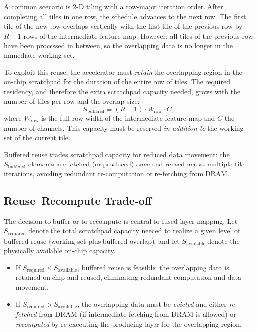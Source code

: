A common scenario is 2-D tiling with a row-major iteration order.
After completing all tiles in one row, the schedule advances to the
next row.
The first tile of the new row overlaps vertically with the first tile
of the previous row by $R - 1$ rows of the intermediate feature map.
However, all tiles of the previous row have been processed in between,
so the overlapping data is no longer in the immediate working set.

To exploit this reuse, the accelerator must \emph{retain} the
overlapping region in the on-chip scratchpad for the duration of
the entire row of tiles.
The required residency, and therefore the extra scratchpad capacity
needed, grows with the number of tiles per row and the overlap
size:
%
\begin{equation}
\label{eq:buffered-reuse-size}
S_{\text{buffered}} = (R - 1) \cdot W_{\text{row}} \cdot C,
\end{equation}
%
where $W_{\text{row}}$ is the full row width of the intermediate
feature map and $C$ the number of channels.
This capacity must be reserved \emph{in addition to} the working
set of the current tile.

Buffered reuse trades scratchpad capacity for reduced data movement:
the $S_{\text{buffered}}$ elements are fetched (or produced) once
and reused across multiple tile iterations, avoiding redundant
re-computation or re-fetching from DRAM.


\subsection{Reuse--Recompute Trade-off}
\label{sec:fds-reuse-recompute}

The decision to buffer or to recompute is central to fused-layer
mapping.
Let $S_{\text{required}}$ denote the total scratchpad capacity
needed to realize a given level of buffered reuse (working set plus
buffered overlap), and let $S_{\text{available}}$ denote the
physically available on-chip capacity.

\begin{itemize}
  \item If $S_{\text{required}} \le S_{\text{available}}$, buffered
        reuse is feasible: the overlapping data is retained on-chip
        and reused, eliminating redundant computation and data
        movement.
  \item If $S_{\text{required}} > S_{\text{available}}$, the
        overlapping data must be \emph{evicted} and either
        \emph{re-fetched} from DRAM (if intermediate fetching from DRAM is
        allowed) or \emph{recomputed} by re-executing the producing
        layer for the overlapping region.
\end{itemize}

